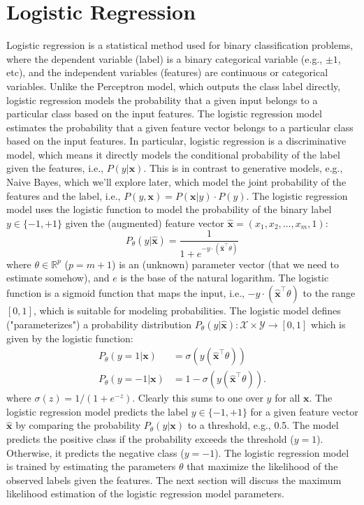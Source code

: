 \documentclass{article}[11pt]
\def\R{\mathbb{R}}
\begin{document}
\section{Logistic Regression}
Logistic regression is a statistical method used for binary classification problems, where the dependent variable (label) is a binary categorical variable (e.g., $\pm{1}$, etc), 
and the independent variables (features) are continuous or categorical variables. Unlike the Perceptron model, which outputs the class label directly, logistic regression models the probability that a given input belongs to a particular class based on the input features.
The logistic regression model estimates the probability that a given feature vector belongs to a particular class based on the input features.
In particular, logistic regression is a discriminative model, which means it directly models the conditional probability of the label given the features, i.e., $P(y|\mathbf{x})$.
This is in contrast to generative models, e.g., Naive Bayes, which we'll explore later, which model the joint probability of the features and the label, i.e., $P(y,\mathbf{x}) = P(\mathbf{x}|y)\cdot{P(y)}$.
The logistic regression model uses the logistic function to model the probability of the binary label $y\in\{-1,+1\}$ given the (augmented) feature vector $\hat{\mathbf{x}} = \left(x_{1},x_{2},\dots,x_{m},1\right)$:
\begin{equation}\label{eq:logistic}
P_{\theta}(y|\hat{\mathbf{x}}) = \frac{1}{1 + e^{-y\cdot\left(\hat{\mathbf{x}}^{\top}\theta\right)}}
\end{equation}
where $\theta\in\R^{p}$ ($p = m+1$) is an (unknown) parameter vector (that we need to estimate somehow), and $e$ is the base of the natural logarithm.
The logistic function is a sigmoid function that maps the input, i.e., $-y\cdot\left(\hat{\mathbf{x}}^{\top}\theta\right)$ to the range $[0,1]$, which is suitable for modeling probabilities.
The logistic model defines ("parameterizes") a probability distribution $P_{\theta}(y|\hat{\mathbf{x}}) : \mathcal{X} \times \mathcal{Y} \to [0,1]$ which is given by the logistic function:
\begin{align*}
P_\theta(y=1 | \mathbf{x}) & = \sigma(y\left(\hat{\mathbf{x}}^{\top}\theta\right)) \\
P_\theta(y=-1 | \mathbf{x}) & = 1-\sigma(y\left(\hat{\mathbf{x}}^{\top}\theta\right)).
\end{align*}
where $\sigma(z) = 1/(1+e^{-z})$. Clearly this sums to one over $y$ for all $\mathbf{x}$.
The logistic regression model predicts the label $y\in\{-1,+1\}$ for a given feature vector $\hat{\mathbf{x}}$ by comparing the probability $P_{\theta}(y|\mathbf{x})$ to a threshold, e.g., 0.5.
The model predicts the positive class if the probability exceeds the threshold ($y = 1$). Otherwise, it predicts the negative class ($y = -1$).
The logistic regression model is trained by estimating the parameters $\theta$ that maximize the likelihood of the observed labels given the features.
The next section will discuss the maximum likelihood estimation of the logistic regression model parameters.
\end{document}
